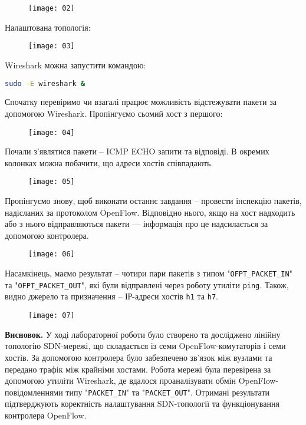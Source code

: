 \documentclass[14pt, a4paper]{extreport}
\begin{document}
	\begin{figure}[H]
		\centering
		\texttt{[image: 02]} 
	\end{figure}
	
	Налаштована топологія:
	
	\begin{figure}[H]
		\centering
		\texttt{[image: 03]} 
	\end{figure}
	
	Wireshark можна запустити командою:
	
	\begin{lstlisting}[language=Bash]
		sudo -E wireshark &\end{lstlisting}
	
	Спочатку перевіримо чи взагалі працює можливість відстежувати пакети за допомогою Wireshark. Пропінгуємо сьомий хост з першого:
	
	\begin{figure}[H]
		\centering
		\texttt{[image: 04]} 
	\end{figure}
	
	Почали з'являтися пакети -- ICMP ECHO запити та відповіді. В окремих колонках можна побачити, що адреси хостів співпадають. 
	
	\begin{figure}[H]
		\centering
		\texttt{[image: 05]} 
	\end{figure}
	
	Пропінгуємо знову, щоб виконати останнє завдання -- провести інспекцію пакетів, надісланих за протоколом OpenFlow. Відповідно нього, якщо на хост надходить або з нього відправляються пакети --- інформація про це надсилається за допомогою контролера.
	
	\begin{figure}[H]
		\centering
		\texttt{[image: 06]} 
	\end{figure}
	
	Насамкінець, маємо результат -- чотири пари пакетів з типом "\texttt{OFPT\_PACKET\_IN}" та "\texttt{OFPT\_PACKET\_OUT}", які були відправлені через роботу утиліти \texttt{ping}. Також, видно джерело та призначення -- ІР-адреси хостів \texttt{h1} та \texttt{h7}.
	
	\begin{figure}[H]
		\centering
		\texttt{[image: 07]} 
	\end{figure}
	
	\textbf{Висновок.}
	У ході лабораторної роботи було створено та досліджено лінійну топологію SDN-мережі, що складається із семи OpenFlow-комутаторів і семи хостів. За допомогою контролера було забезпечено зв’язок між вузлами та передано трафік між крайніми хостами. Робота мережі була перевірена за допомогою утиліти Wireshark, де вдалося проаналізувати обмін OpenFlow-повідомленнями типу "\texttt{PACKET\_IN}" та "\texttt{PACKET\_OUT}". Отримані результати підтверджують коректність налаштування SDN-топології та функціонування контролера OpenFlow.
	
\end{document}
